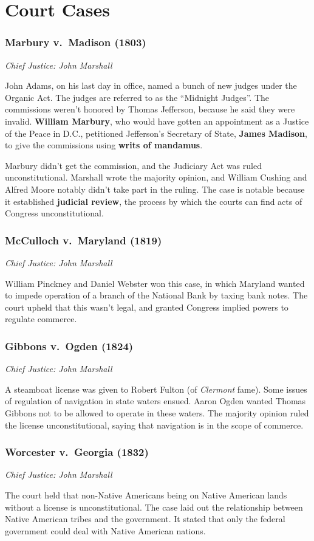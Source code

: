 \chapter{Court Cases}

\newcommand{\courtcase}[3]{%
  \subsection*{#1 (#2)}%
  \noindent\textit{Chief Justice: #3}%
}

\courtcase{Marbury v.\ Madison}{1803}{John Marshall}

John Adams, on his last day in office, named a bunch of new judges under the Organic Act.
The judges are referred to as the ``Midnight Judges''.
The commissions weren't honored by Thomas Jefferson, because he said they were invalid.
\textbf{William Marbury}, who would have gotten an appointment as a Justice of the Peace in D.C.,
petitioned Jefferson's Secretary of State, \textbf{James Madison},
to give the commissions using \textbf{writs of mandamus}.

Marbury didn't get the commission, and the Judiciary Act was ruled unconstitutional.
Marshall wrote the majority opinion, and William Cushing and Alfred Moore notably didn't take part in the ruling.
The case is notable because it established \textbf{judicial review},
the process by which the courts can find acts of Congress unconstitutional.

\courtcase{McCulloch v.\ Maryland}{1819}{John Marshall}

William Pinckney and Daniel Webster won this case,
in which Maryland wanted to impede operation of a branch of the National Bank by taxing bank notes.
The court upheld that this wasn't legal, and granted Congress implied powers to regulate commerce.

\courtcase{Gibbons v.\ Ogden}{1824}{John Marshall}

A steamboat license was given to Robert Fulton (of \textit{Clermont} fame).
Some issues of regulation of navigation in state waters ensued.
Aaron Ogden wanted Thomas Gibbons not to be allowed to operate in these waters.
The majority opinion ruled the license unconstitutional,
saying that navigation is in the scope of commerce.

\courtcase{Worcester v.\ Georgia}{1832}{John Marshall}

The court held that non-Native Americans being on Native American lands without a license is unconstitutional.
The case laid out the relationship between Native American tribes and the government.
It stated that only the federal government could deal with Native American nations.

